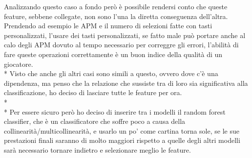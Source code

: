 Analizzando questo caso a fondo però è possibile rendersi conto che queste feature, sebbene collegate, non sono l’una la diretta conseguenza dell’altra. Prendendo ad esempio le APM e il numero di selezioni fatte con tasti personalizzati, l’usare dei tasti personalizzati, se fatto male può portare anche al calo degli APM dovuto al tempo necessario per correggre gli errori, l’abilità di fare queste operazioni correttamente è un buon indice della qualità di un giocatore. \\*
Visto che anche gli altri casi sono simili a questo, ovvero dove c’è una dipendenza, ma penso che la relazione che sussiste tra di loro sia significativa alla classificazione, ho deciso di lasciare tutte le feature per ora. \\*\\*
Per essere sicuro però ho deciso di inserire tra i modelli il random forest classifier, che è un classificatore che soffre poco a causa della collinearità/multicollinearità, e usarlo un po' come cartina torna sole, se le sue prestazioni finali saranno di molto maggiori rispetto a quelle degli altri modelli sarà necessario tornare indietro e selezionare meglio le feature.
